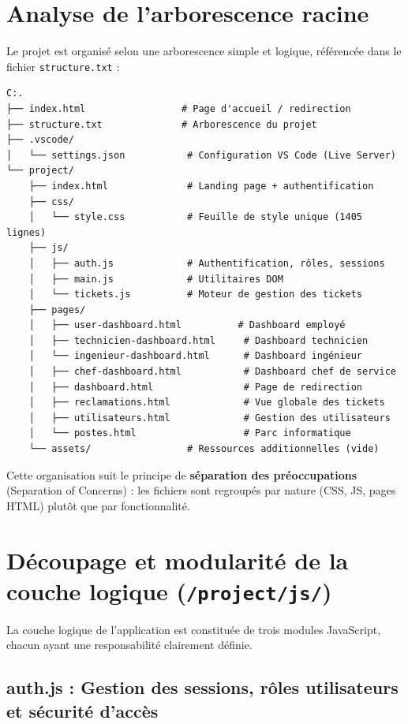 \documentclass[12pt,a4paper,twoside]{report}
\begin{document}
\section{Analyse de l'arborescence racine}

Le projet est organisé selon une arborescence simple et logique, référencée dans le fichier \texttt{structure.txt} :

\begin{verbatim}
C:.
├── index.html                 # Page d'accueil / redirection
├── structure.txt              # Arborescence du projet
├── .vscode/
│   └── settings.json           # Configuration VS Code (Live Server)
└── project/
    ├── index.html              # Landing page + authentification
    ├── css/
    │   └── style.css           # Feuille de style unique (1405 lignes)
    ├── js/
    │   ├── auth.js             # Authentification, rôles, sessions
    │   ├── main.js             # Utilitaires DOM
    │   └── tickets.js          # Moteur de gestion des tickets
    ├── pages/
    │   ├── user-dashboard.html          # Dashboard employé
    │   ├── technicien-dashboard.html     # Dashboard technicien
    │   └── ingenieur-dashboard.html      # Dashboard ingénieur
    │   ├── chef-dashboard.html           # Dashboard chef de service
    │   ├── dashboard.html                # Page de redirection
    │   ├── reclamations.html             # Vue globale des tickets
    │   ├── utilisateurs.html             # Gestion des utilisateurs
    │   └── postes.html                   # Parc informatique
    └── assets/                 # Ressources additionnelles (vide)
\end{verbatim}

Cette organisation suit le principe de \textbf{séparation des préoccupations} (Separation of Concerns) : les fichiers sont regroupés par nature (CSS, JS, pages HTML) plutôt que par fonctionnalité.

\section{Découpage et modularité de la couche logique (\texttt{/project/js/})}

La couche logique de l'application est constituée de trois modules JavaScript, chacun ayant une responsabilité clairement définie.

\subsection{auth.js : Gestion des sessions, rôles utilisateurs et sécurité d'accès}
\end{document}
